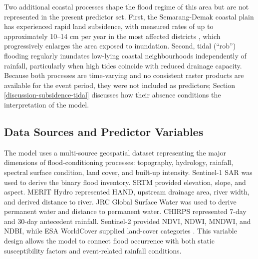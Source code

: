 \documentclass[11pt,twoside]{article}
\begin{document}
Two additional coastal processes shape the flood regime of this area but are
not represented in the present predictor set. First, the Semarang-Demak coastal
plain has experienced rapid land subsidence, with measured rates of up to
approximately 10--14 cm per year in the most affected districts
\parencite{abidin2015}, which progressively enlarges the area exposed to
inundation. Second, tidal (``rob'') flooding regularly inundates low-lying
coastal neighbourhoods independently of rainfall, particularly when high tides
coincide with reduced drainage capacity. Because both processes are
time-varying and no consistent raster products are available for the event
period, they were not included as predictors; Section
\ref{discussion-subsidence-tidal} discusses how their absence conditions the
interpretation of the model.
 
 
\subsection{Data Sources and Predictor Variables}\label{data-sources-and-predictor-variables}
 
The model uses a multi-source geospatial dataset representing the major
dimensions of flood-conditioning processes: topography, hydrology, rainfall,
spectral surface condition, land cover, and built-up intensity. Sentinel-1 SAR
was used to derive the binary flood inventory. SRTM provided elevation, slope,
and aspect. MERIT Hydro represented HAND, upstream drainage area, river width,
and derived distance to river. JRC Global Surface Water was used to derive
permanent water and distance to permanent water. CHIRPS represented 7-day and
30-day antecedent rainfall. Sentinel-2 provided NDVI, NDWI, MNDWI, and NDBI,
while ESA WorldCover supplied land-cover categories
\cite{farr2007,yamazaki2019,pekel2016,funk2015,zanaga2021}. This variable
design allows the model to connect flood occurrence with both static
susceptibility factors and event-related rainfall conditions.
 
\end{document}
